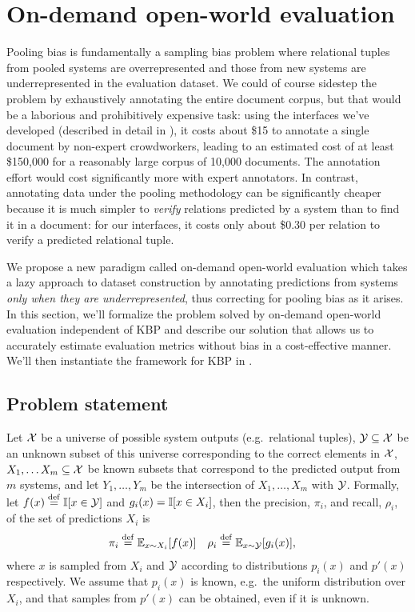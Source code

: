 \section{On-demand open-world evaluation}
\label{sec:method}

Pooling bias is fundamentally a sampling bias problem where relational tuples from pooled systems are overrepresented and those from new systems are underrepresented in the evaluation dataset.
We could of course sidestep the problem by exhaustively annotating the entire document corpus, but that would be a laborious and prohibitively expensive task:
  using the interfaces we've developed (described in detail in ), it costs about \$15 to annotate a single document by non-expert crowdworkers, leading to an estimated cost of at least \$150,000 for a reasonably large corpus of 10,000 documents.
The annotation effort would cost significantly more with expert annotators.
In contrast, annotating data under the pooling methodology can be significantly cheaper because it is much simpler to \textit{verify} relations predicted by a system than to find it in a document: for our interfaces, it costs only about \$0.30 per relation to verify a predicted relational tuple.

We propose a new paradigm called on-demand open-world evaluation which takes a lazy approach to dataset construction by annotating predictions from systems \textit{only when they are underrepresented}, thus correcting for pooling bias as it arises.
In this section, we'll formalize the problem solved by on-demand open-world evaluation independent of KBP and describe our solution that allows us to accurately estimate evaluation metrics without bias in a cost-effective manner. 
We'll then instantiate the framework for KBP in .

\subsection{Problem statement}
Let $\mathcal{X}$ be a universe of possible system outputs (e.g.\ relational tuples),
  $\mathcal{Y} \subseteq \mathcal{X}$ be an unknown subset of this universe corresponding to the correct elements in $\mathcal{X}$,
  $X_1, \ldots X_m \subseteq \mathcal{X}$ be known subsets that correspond to the predicted output from $m$ systems,
  and let $Y_1, \ldots, Y_m$ be the intersection of $X_1, \ldots, X_m$ with $\mathcal{Y}$.
Formally, let $f(x) \stackrel{\rm def}{=} \mathbb{I}[x \in \mathcal{Y}]$ and $g_i(x) = \mathbb{I}[x \in X_i]$, then the precision, $\pi_i$, and recall, $\rho_i$, of the set of predictions $X_i$ is
\begin{align*}
  \pi_i  &\stackrel{\rm def}{=} \mathbb{E}_{x \sim X_i}[f(x)] &
  \rho_i &\stackrel{\rm def}{=} \mathbb{E}_{x \sim \mathcal{Y}}[g_i(x)],
\end{align*}
where $x$ is sampled from $X_i$ and $\mathcal{Y}$ according to distributions $p_i(x)$ and $p'(x)$ respectively.
We assume that $p_i(x)$ is known, e.g.\ the uniform distribution over $X_i$, and that samples from $p'(x)$ can be obtained, even if it is unknown.

